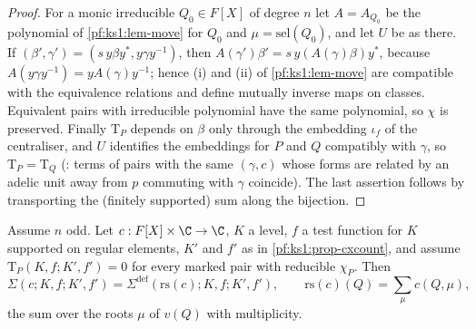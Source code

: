 \begin{proof}
For a monic irreducible $Q_0\in F[X]$ of degree $n$ let $A=A_{Q_0}$ be the polynomial of \cref{pf:ks1:lem-move} for $Q_0$ and
$\mu=\mathrm{sel}(Q_0)$, and let $U$ be as there. If $(\beta',\gamma')=(s\,y\beta y^*,y\gamma y^{-1})$, then $A(\gamma')\beta'=s\,y(A(\gamma)\beta)y^*$, because
$A(y\gamma y^{-1})=yA(\gamma)y^{-1}$; hence (i) and (ii) of \cref{pf:ks1:lem-move} are compatible with the equivalence relations and define mutually inverse maps on classes.
Equivalent pairs with irreducible polynomial have the same polynomial, so $\chi$ is preserved. Finally $\mathrm T_P$ depends on $\beta$ only through the
embedding $\iota_f$ of the centraliser, and $U$ identifies the embeddings for $P$ and $Q$ compatibly with $\gamma$, so $\mathrm T_P=\mathrm T_Q$
(: terms of pairs with the same $(\gamma,c)$ whose forms are related by an adelic
unit away from $p$ commuting with $\gamma$ coincide). The last assertion follows by transporting the (finitely supported) sum along the bijection.
\end{proof}

\begin{proposition}\label{pf:ks1:prop-h1}
Assume $n$ odd. Let $c:F[X]\times\C\to\C$, $K$ a level, $f$ a test function for $K$ supported on regular elements, $K'$ and $f'$ as in
\cref{pf:ks1:prop-cxcount}, and assume $\mathrm T_P(K,f;K',f')=0$ for every marked pair with reducible $\chi_P$. Then
\[\Sigma(c;K,f;K',f')=\Sigma^{\mathrm{def}}(\mathrm{rs}(c);K,f;K',f'),\qquad \mathrm{rs}(c)(Q)=\sum_{\mu}c(Q,\mu),\]
the sum over the roots $\mu$ of $v(Q)$ with multiplicity.
\end{proposition}

